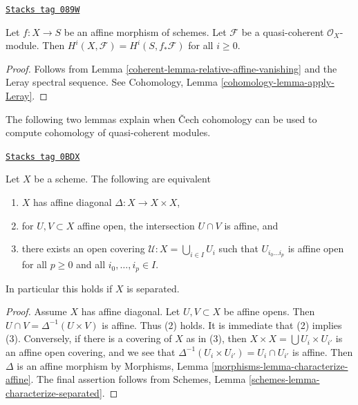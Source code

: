 \begin{lemma}
\label{coherent-lemma-relative-affine-cohomology}
\href{https://stacks.math.columbia.edu/tag/089W}{\texttt{Stacks tag 089W}}

Let $f : X \to S$ be an affine morphism of schemes.
Let $\mathcal{F}$ be a quasi-coherent $\mathcal{O}_X$-module.
Then $H^i(X, \mathcal{F}) = H^i(S, f_*\mathcal{F})$ for all $i \geq 0$.
\end{lemma}

\begin{proof}

Follows from Lemma \ref{coherent-lemma-relative-affine-vanishing}
and the Leray spectral sequence. See
Cohomology, Lemma \ref{cohomology-lemma-apply-Leray}.
\end{proof}

The following two lemmas explain when {\v C}ech cohomology
can be used to compute cohomology of quasi-coherent modules.

\begin{lemma}
\label{coherent-lemma-affine-diagonal}
\href{https://stacks.math.columbia.edu/tag/0BDX}{\texttt{Stacks tag 0BDX}}

Let $X$ be a scheme. The following are equivalent
\begin{enumerate}
\item $X$ has affine diagonal $\Delta : X \to X \times X$,
\item for $U, V \subset X$ affine open, the intersection
$U \cap V$ is affine, and
\item there exists an open covering $\mathcal{U} : X = \bigcup_{i \in I} U_i$
such that $U_{i_0 \ldots i_p}$ is affine open for all $p \ge 0$ and all
$i_0, \ldots, i_p \in I$.
\end{enumerate}
In particular this holds if $X$ is separated.
\end{lemma}

\begin{proof}
Assume $X$ has affine diagonal. Let $U, V \subset X$ be affine opens.
Then $U \cap V = \Delta^{-1}(U \times V)$ is affine. Thus (2) holds.
It is immediate that (2) implies (3). Conversely, if there is a
covering of $X$ as in (3), then $X \times X = \bigcup U_i \times U_{i'}$
is an affine open covering, and we see that
$\Delta^{-1}(U_i \times U_{i'}) = U_i \cap U_{i'}$
is affine. Then $\Delta$ is an affine morphism by
Morphisms, Lemma \ref{morphisms-lemma-characterize-affine}.
The final assertion follows from Schemes, Lemma
\ref{schemes-lemma-characterize-separated}.
\end{proof}

